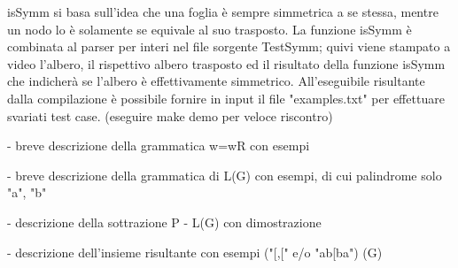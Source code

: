 \documentclass[a4paper, oneside, 11pt]{article}
\begin{document}
isSymm si basa sull'idea che una foglia \`e sempre simmetrica a se stessa, mentre un nodo lo \`e solamente se equivale al suo trasposto.
   La funzione isSymm \`e combinata al parser per interi nel file sorgente TestSymm; quivi viene stampato a video l'albero, il rispettivo albero trasposto ed il risultato della funzione isSymm che indicherà se l'albero \`e effettivamente simmetrico.
  All'eseguibile risultante dalla compilazione \`e possibile fornire in input il file "examples.txt" per effettuare svariati test case.
  (eseguire make demo per veloce riscontro)

  - breve descrizione della grammatica w=wR con esempi

- breve descrizione della grammatica di L(G) con esempi, di cui palindrome solo "a", "b"

- descrizione della sottrazione P - L(G) con dimostrazione

- descrizione dell'insieme risultante con esempi ("[,[" e/o "ab[ba")
  (G)
\end{document}
